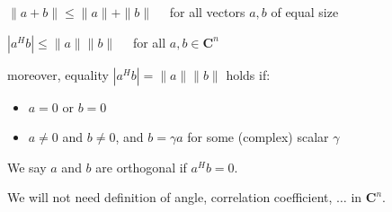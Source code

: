 \begin{theorem}
$ \|a+b\| \leq\|a\|+\|b\| \quad $ for all vectors $ a, b $ of equal size
\end{theorem}

\begin{theorem}
    $ \left|a^{H} b\right| \leq\|a\|\|b\| \quad $ for all $ a, b \in \mathbf{C}^{n} $

    moreover, equality $ \left|a^{H} b\right|=\|a\|\|b\| $ holds if:

    \begin{itemize}
        \item $ a=0 $ or $ b=0 $
        \item $ a \neq 0 $ and $ b \neq 0 $, and $ b=\gamma a $ for some (complex) scalar $ \gamma $
    \end{itemize}
\end{theorem}

We say $ a $ and $ b $ are orthogonal if $ a^{H} b=0 $.

We will not need definition of angle, correlation coefficient, $ \ldots $ in $ \mathbf{C}^{n} $.